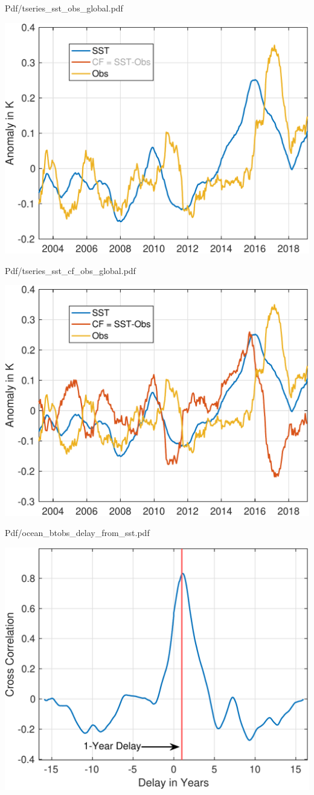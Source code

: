 \documentclass[10pt,t]{beamer}
\begin{document}
\begin{frame}[label={sec:org598fb9f}]{Pdf/tseries\_sst\_obs\_global.pdf}
\begin{center}
\includegraphics[width=0.7\linewidth]{./Figs/Pdf/tseries_sst_obs_global.pdf}
\end{center}
\end{frame}

\begin{frame}[label={sec:org7678aef}]{Pdf/tseries\_sst\_cf\_obs\_global.pdf}
\begin{center}
\includegraphics[width=0.7\linewidth]{./Figs/Pdf/tseries_sst_cf_obs_global.pdf}
\end{center}
\end{frame}

\begin{frame}[label={sec:org8aeb338}]{Pdf/ocean\_btobs\_delay\_from\_sst.pdf}
\begin{center}
\includegraphics[width=0.7\linewidth]{./Figs/Pdf/ocean_btobs_delay_from_sst.pdf}
\end{center}
\end{frame}
\end{document}
